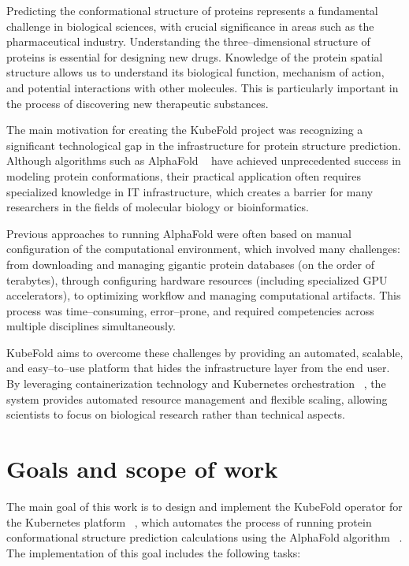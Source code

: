 Predicting the conformational structure of proteins represents a fundamental challenge in biological sciences, with crucial significance in areas such as the pharmaceutical industry.
Understanding the three--dimensional structure of proteins is essential for designing new drugs.
Knowledge of the protein spatial structure allows us to understand its biological function, mechanism of action, and potential interactions with other molecules.
This is particularly important in the process of discovering new therapeutic substances.

The main motivation for creating the KubeFold project was recognizing a significant technological gap in the infrastructure for protein structure prediction.
Although algorithms such as AlphaFold ~\cite{alphafold3} have achieved unprecedented success in modeling protein conformations, their practical application often requires specialized knowledge in IT infrastructure, which creates a barrier for many researchers in the fields of molecular biology or bioinformatics.

Previous approaches to running AlphaFold were often based on manual configuration of the computational environment, which involved many challenges: from downloading and managing gigantic protein databases (on the order of terabytes), through configuring hardware resources (including specialized GPU accelerators), to optimizing workflow and managing computational artifacts.
This process was time--consuming, error--prone, and required competencies across multiple disciplines simultaneously.

KubeFold aims to overcome these challenges by providing an automated, scalable, and easy--to--use platform that hides the infrastructure layer from the end user.
By leveraging containerization technology and Kubernetes orchestration ~\cite{kubernetes, container_orchestration}, the system provides automated resource management and flexible scaling, allowing scientists to focus on biological research rather than technical aspects.


\section{Goals and scope of work}

The main goal of this work is to design and implement the KubeFold operator for the Kubernetes platform ~\cite{kubernetes}, which automates the process of running protein conformational structure prediction calculations using the AlphaFold algorithm ~\cite{alphafold3}.
The implementation of this goal includes the following tasks:

